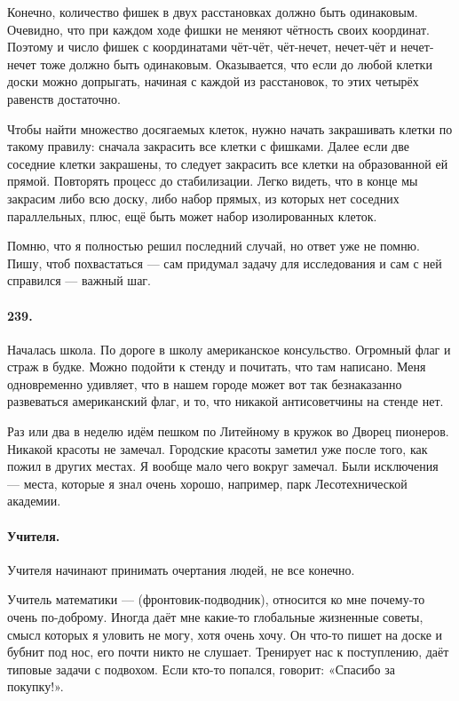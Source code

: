 \documentclass{book}
\begin{document}
Конечно, количество фишек в двух расстановках должно быть одинаковым.
Очевидно, что при каждом ходе фишки не меняют чётность своих координат.
Поэтому и число фишек с координатами чёт-чёт, чёт-нечет, нечет-чёт и нечет-нечет тоже должно быть одинаковым.
Оказывается, что если до любой клетки доски можно допрыгать, начиная с каждой из расстановок, то этих четырёх равенств достаточно.

Чтобы найти множество досягаемых клеток, нужно начать закрашивать клетки по такому правилу:
сначала закрасить все клетки с фишками.
Далее если две соседние клетки закрашены, то следует закрасить все клетки на образованной ей прямой.
Повторять процесс до стабилизации.
Легко видеть, что в конце мы закрасим либо всю доску,
либо набор прямых, из которых нет соседних параллельных, плюс, ещё быть может набор изолированных клеток.

Помню, что я полностью решил последний случай, но ответ уже не помню.
Пишу, чтоб похвастаться --- сам придумал задачу для исследования и сам с ней справился --- важный шаг.

\paragraph{239.}
Началась школа.
По дороге в школу американское консульство.
Огромный флаг и страж в будке.
Можно подойти к стенду и почитать, что там написано.
Меня одновременно удивляет, что в нашем городе может вот так безнаказанно развеваться американский флаг,
и то, что никакой антисоветчины на стенде нет.

Раз или два в неделю идём пешком по 
Литейному в кружок во Дворец пионеров.
Никакой красоты не замечал.
Городские красоты заметил уже после того, как пожил в других местах.
Я вообще мало чего вокруг замечал.
Были исключения --- места, которые я знал очень хорошо, например, парк Лесотехнической академии.

\paragraph{Учителя.}
Учителя начинают принимать очертания людей, 
не все конечно.

{\sloppy

Учитель математики ---  (фронтовик-подводник),
относится ко мне почему-то очень по-доброму.
Иногда даёт мне какие-то глобальные жизненные советы, 
смысл которых я уловить не могу, хотя очень хочу.
Он что-то пишет на доске и бубнит под нос,
его почти никто не слушает.
Тренирует нас к поступлению,
даёт типовые задачи с подвохом.
Если кто-то попался, говорит: «Спасибо за покупку!».

}
\end{document}
